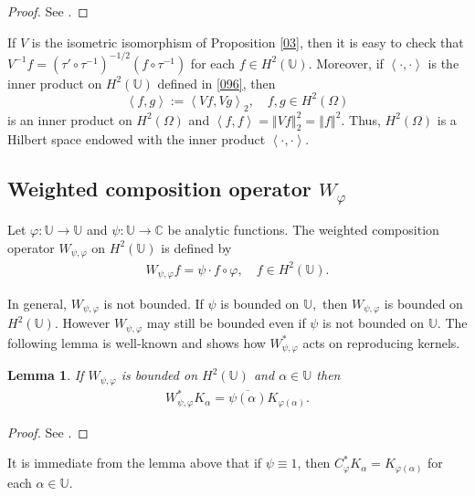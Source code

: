 \documentclass[11pt]{amsart}%
\newtheorem{lem}[thm]{Lemma}
\theoremstyle{definition}
\theoremstyle{remark}
\numberwithin{equation}{section}
\begin{document}
\begin{proof}
See \cite[Corollary, p. 169]{Duren}.
\end{proof}
If $V$ is the isometric isomorphism of Proposition \ref{03}, then it is easy to check that $V^{-1}f=(\tau'\circ \tau^{-1})^{-1/2}(f\circ \tau^{-1})$ for each $f\in H^2(\mathbb{U}).$ Moreover, if $\left\langle
\cdot,\cdot\right\rangle $ is the inner product on $H^{2}(\mathbb{U})$ defined
in \eqref{096}, then
\[
\left\langle f,g\right\rangle :=\left\langle Vf,Vg\right\rangle_2
,\quad f,g\in H^{2}(\Omega)
\]
is an inner product on $H^{2}(\Omega)$ and $\left\langle f,f\right\rangle
=\left\Vert Vf\right\Vert ^{2}_2=\left\Vert f\right\Vert %
^{2}.$ Thus, $H^{2}(\Omega)$ is a Hilbert space endowed with the inner product
$\left\langle \cdot,\cdot\right\rangle.$

\subsection{Weighted composition operator $W_{\varphi}$}


Let $\varphi:\mathbb{U}\longrightarrow\mathbb{U}$ and $\psi:\mathbb{U}%
\longrightarrow\mathbb{C}$ be analytic functions. The weighted
composition operator $W_{\psi, \varphi}$ on $H^{2}(\mathbb{U})$ is defined
by
\begin{align*}
W_{\psi, \varphi}f=\psi\cdot f\circ\varphi, \quad f\in H^{2}(\mathbb{U}).
\end{align*}


In general, $W_{\psi,\varphi}$ is not bounded. If $\psi$ is bounded on
$\mathbb{U},$ then $W_{\psi,\varphi}$ is bounded on $H^{2}(\mathbb{U})$.
However $W_{\psi,\varphi}$ may still be bounded even if $\psi$ is not bounded
on $\mathbb{U}.$ The following lemma is well-known and shows how
$W_{\psi,\varphi}^{\ast}$ acts on reproducing kernels.

\begin{lem}
\label{05} If $W_{\psi,\varphi}$ is bounded on $H^{2}(\mathbb{U})$ and
$\alpha\in\mathbb{U}$ then
\begin{align}
\label{04}W_{\psi, \varphi}^{*}K_{\alpha}=\overline{{\psi}(\alpha)}%
K_{\varphi(\alpha)} .
\end{align}

\end{lem}

\begin{proof}
See \cite[Lemma 3.2]{Shapiro-Smith}.
\end{proof}
It is immediate from the lemma above that if $\psi\equiv 1$, then  $C_{\varphi}^{*}K_{\alpha}=K_{\varphi(\alpha)}$ for each $\alpha \in \mathbb{U}.$
\end{document}
